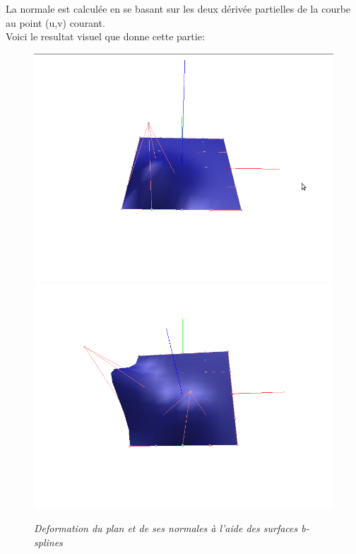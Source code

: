 \documentclass[12pt,letterpaper]{article}
\begin{document}
	La normale est calculée en se basant sur les deux dérivée partielles de la courbe au point (u,v) courant.\\
	\newpage
	Voici le resultat visuel que donne cette partie:
\begin{figure}[h!]
	\centering
	\includegraphics[scale=0.3]{images/img3.png}
	\includegraphics[scale=0.3]{images/img4.png}
	\caption{\textit{Deformation du plan et de ses normales à l'aide des surfaces b-splines}}
\end{figure}
\end{document}
